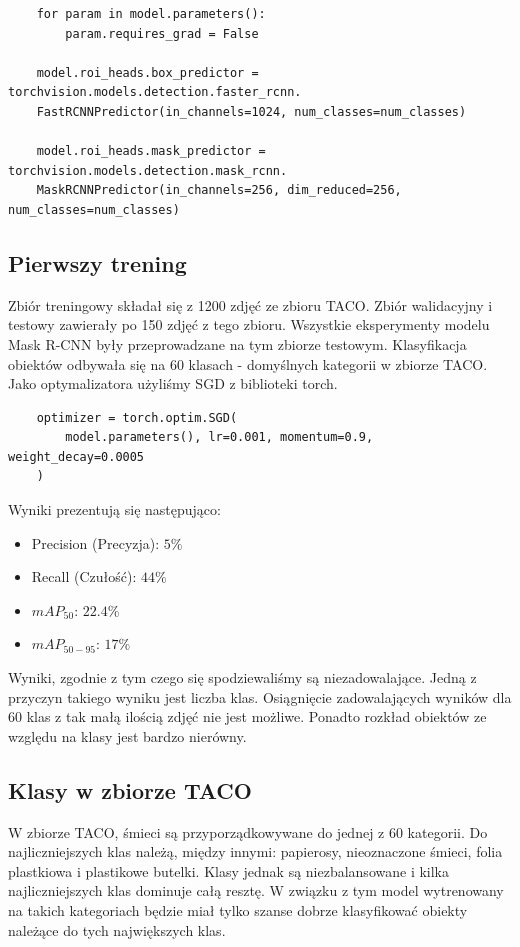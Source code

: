 \documentclass[licencjacka]{pracamgr}
\begin{document}
\begin{verbatim}
    for param in model.parameters():
        param.requires_grad = False
        
    model.roi_heads.box_predictor = torchvision.models.detection.faster_rcnn.
    FastRCNNPredictor(in_channels=1024, num_classes=num_classes)
    
    model.roi_heads.mask_predictor = torchvision.models.detection.mask_rcnn.
    MaskRCNNPredictor(in_channels=256, dim_reduced=256, num_classes=num_classes)
\end{verbatim}
\subsection{Pierwszy trening}
Zbiór treningowy składał się z 1200 zdjęć ze zbioru TACO. Zbiór walidacyjny i testowy zawierały po 150 zdjęć z tego zbioru. Wszystkie eksperymenty modelu Mask R-CNN były przeprowadzane na tym zbiorze testowym. Klasyfikacja obiektów odbywała się na 60 klasach - domyślnych kategorii w zbiorze TACO.
Jako optymalizatora użyliśmy SGD z biblioteki torch.
\begin{verbatim}
    optimizer = torch.optim.SGD(
        model.parameters(), lr=0.001, momentum=0.9, weight_decay=0.0005
    )
\end{verbatim}


Wyniki prezentują się następująco:


\begin{itemize}
    \item Precision (Precyzja): $5\%$
    \item Recall (Czułość): $44\%$
    \item $mAP_{50}$: $22.4\%$
    \item $mAP_{50-95}$: $17\%$
\end{itemize}

Wyniki, zgodnie z tym czego się spodziewaliśmy są niezadowalające. Jedną z przyczyn takiego wyniku jest liczba klas. Osiągnięcie zadowalających wyników dla 60 klas z tak małą ilością zdjęć nie jest możliwe. Ponadto rozkład obiektów ze względu na klasy jest bardzo nierówny.
\subsection{Klasy w zbiorze TACO}

W zbiorze TACO, śmieci są przyporządkowywane do jednej z 60 kategorii. Do najliczniejszych klas należą, między innymi: papierosy, nieoznaczone śmieci, folia plastkiowa i plastikowe butelki. Klasy jednak są niezbalansowane i kilka najliczniejszych klas dominuje całą resztę. W związku z tym model wytrenowany na takich kategoriach będzie miał tylko szanse dobrze klasyfikować obiekty należące do tych największych klas. 
\end{document}
